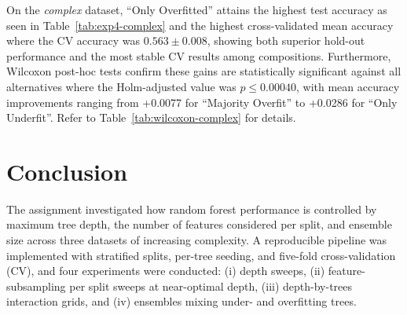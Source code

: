 \documentclass[conference]{IEEEtran}
\begin{document}
On the \textit{complex} dataset, ``Only Overfitted'' attains the highest test accuracy as seen in Table~\ref{tab:exp4-complex} and the highest cross-validated mean accuracy where the CV accuracy was $0.563 \pm 0.008$, showing both superior hold-out performance and the most stable CV results among compositions.  Furthermore, Wilcoxon post-hoc tests confirm these gains are statistically significant against all alternatives where the Holm-adjusted value was $p \le 0.00040$, with mean accuracy improvements ranging from +0.0077 for  ``Majority Overfit'' to +0.0286 for ``Only Underfit''. Refer to Table~\ref{tab:wilcoxon-complex} for details.\\ 


\begin{table}[H]
\centering
\caption{Post-hoc Wilcoxon versus ``Only Overfitted'' - \textit{complex}. One-sided alternative; Holm-adjusted p-values.}
\label{tab:wilcoxon-complex}
\end{table}

\section{Conclusion}

The assignment investigated how random forest performance is controlled by maximum tree depth, the number of features considered per split, and ensemble size across three datasets of increasing complexity. A reproducible pipeline was implemented with stratified splits, per-tree seeding, and five-fold cross-validation (CV), and four experiments were conducted: (i) depth sweeps, (ii) feature-subsampling per split sweeps at near-optimal depth, (iii) depth-by-trees interaction grids, and (iv) ensembles mixing under- and overfitting trees.
\end{document}
